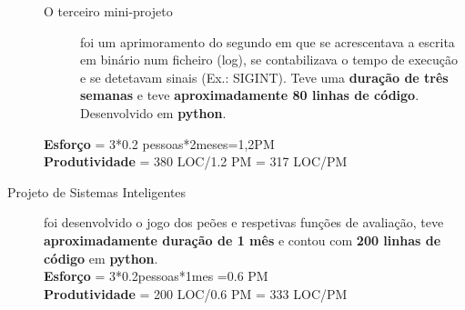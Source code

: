 \documentclass[a4paper]{report}
\begin{document}
\begin{description}
\begin{description}
		\item[O terceiro mini-projeto] foi um aprimoramento do segundo em que se acrescentava a escrita em binário num ficheiro (log), se contabilizava o tempo de execução e se detetavam sinais (Ex.: SIGINT). Teve uma \textbf{duração de três semanas} e teve \textbf{aproximadamente 80 linhas de código}. Desenvolvido em \textbf{python}.
	\end{description}\mbox{}\textbf{Esforço} = 3*0.2 pessoas*2meses=1,2PM\\ \textbf{Produtividade} = 380 LOC/1.2 PM = 317 LOC/PM
	\item[Projeto de Sistemas Inteligentes] foi desenvolvido o jogo dos peões e respetivas funções de avaliação, teve \textbf{aproximadamente duração de 1 mês} e contou com \textbf{200 linhas de código} em \textbf{python}.\\\textbf{Esforço} = 3*0.2pessoas*1mes =0.6 PM\\ \textbf{Produtividade} = 200 LOC/0.6 PM = 333 LOC/PM
\end{description}
\end{document}
